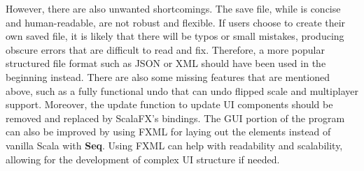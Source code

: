 \documentclass[12pt]{article}
\begin{document}
However, there are also unwanted shortcomings. The save file, while is concise
and human-readable, are not robust and flexible. If users choose to create their
own saved file, it is likely that there will be typos or small mistakes,
producing obscure errors that are difficult to read and fix. Therefore, a more
popular structured file format such as JSON or XML should have been used in the
beginning instead. There are also some missing features that are mentioned
above, such as a fully functional undo that can undo flipped scale and
multiplayer support. Moreover, the update function to update UI components
should be removed and replaced by ScalaFX's bindings. The GUI portion of the
program can also be improved by using FXML for laying out the elements instead
of vanilla Scala with \textbf{Seq}. Using FXML can help with readability and
scalability, allowing for the development of complex UI structure if needed.

\nocite{nystrom2014game} 
\nocite{scalacollection} 
\nocite{scalafx}


 


\newpage
\end{document}
